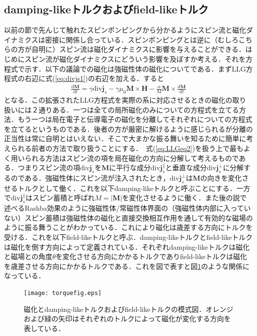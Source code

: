 \subsection{damping-likeトルクおよびfield-likeトルク}
以前の節で先んじて触れたスピンポンピングから分かるようにスピン流と磁化ダイナミクスは密接に関係し合っている\cite{slonczewski1996current}．スピンポンピングとは逆に（むしろこちらの方が自明に）スピン流は磁化ダイナミクスに影響を与えることができる．はじめにスピン流が磁化ダイナミクスにどういう影響を及ぼすか考える．それを方程式で示す．以下の議論での磁化は強磁性体の磁化についてである．まずLLG方程式の右辺に式(\ref{eq:divjs1})の右辺を加える．すると
\begin{eqnarray}
\frac{\mathrm{d}\bm{M}}{\mathrm{d}t}=\gamma\mathrm{div}\bm{j}_{s}-\gamma\mu_{0}\bm{M}\times\bm{H}-\frac{\alpha}{M}\bm{M}\times\frac{\mathrm{d}\bm{M}}{\mathrm{d}t}
\label{eq:LLGeq2}
\end{eqnarray}
となる．この拡張されたLLG方程式を実際の系に対応させるときの磁化の取り扱いには２通りある．一つは全ての局所磁化のみについての方程式を立てる方法．もう一つは局在電子と伝導電子の磁化を分離してそれぞれについての方程式を立てるというものである．後者の方が厳密に解けるように感じられるが分離の正当性は常に自明とはいえない．そこで大まかな振る舞いを知るために簡単に考えられる前者の方法で取り扱うことにする．\
式(\ref{eq:LLGeq2})を扱う上で最もよく用いられる方法はスピン流の項を局在磁化の方向に分解して考えるものである．つまりスピン流の項$\mathrm{div}\bm{j}_{s}$を$\bm{M}$に平行な成分$\mathrm{div}\bm{j}_{s}^{\parallel}$と垂直な成分$\mathrm{div}\bm{j}_{s}^{\perp}$に分解するのである．強磁性体にスピン流が注入されたとき，$\mathrm{div}\bm{j}_{s}^{\perp}$は$\bm{M}$の向きを変化させるトルクとして働く．これを以下damping-likeトルクと呼ぶことにする．一方で$\mathrm{div}\bm{j}_{s}^{\parallel}$はスピン蓄積と呼ばれ$M=|\bm{M}|$を変化させるように働く．また後の説で述べるRashba効果のように強磁性体/常磁性体界面の（強磁性体内部に入っていない）スピン蓄積は強磁性体の磁化と直接交換相互作用を通して有効的な磁場のように振る舞うことがわかっている．これにより磁化は歳差する方向にトルクを受ける．これを以下field-likeトルクと呼ぶ．damping-likeトルクとfield-likeトルクは磁化を倒す方向によって定義されている．それぞれdamping-likeトルクは磁化と磁場との角度$\theta$を変化させる方向にかかるトルクでありfield-likeトルクは磁化を歳差させる方向にかかるトルクである．これを図で表すと図\ref{torquefig}のような関係になっている．

\begin{figure}[h]
\centerline{
\texttt{[image: torquefig.eps]}
}
\caption{磁化とdamping-likeトルクおよびfield-likeトルクの模式図．オレンジおよび緑の矢印はそれぞれのトルクによって磁化が変化する方向を表している．
}
\label{torquefig} 
\end{figure}


